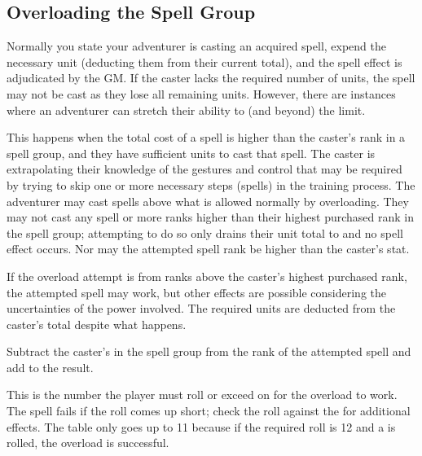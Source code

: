 \begin{multicols*}{2}
\subsection{Overloading the Spell Group}
Normally you state your adventurer is casting an acquired spell, expend the necessary unit (deducting them from their current total), and the spell effect is adjudicated by the GM. If the caster lacks the required number of units, the spell may not be cast as they lose all remaining units. However, there are instances where an adventurer can stretch their ability to (and beyond) the limit.

This happens when the total cost of a spell is higher than the caster's rank in a spell group, and they have sufficient units to cast that spell. The caster is extrapolating their knowledge of the gestures and control that may be required by trying to skip one or more necessary steps (spells) in the training process. The adventurer may cast spells above what is allowed normally by overloading. They may not cast any spell  or more ranks higher than their highest purchased rank in the spell group; attempting to do so only drains their unit total to  and no spell effect occurs. Nor may the attempted spell rank be higher than the caster's \PWR stat.

If the overload attempt is from  ranks above the caster's highest purchased rank, the attempted spell may work, but other effects are possible considering the uncertainties of the power involved. The required units are deducted from the caster's total despite what happens. 

Subtract the caster's  in the spell group from the rank of the attempted spell and add  to the result. 

This is the number the player must roll or exceed on  for the overload to work. The spell fails if the roll comes up short; check the roll against the  for additional effects. The table only goes up to 11 because if the required roll is 12 and a  is rolled, the overload is successful.




\end{multicols*}
